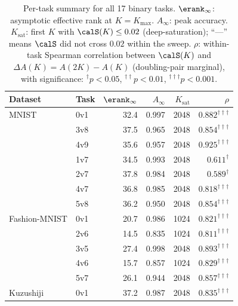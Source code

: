 \begin{table}[t]
  \centering
  \caption{Per-task summary for all 17 binary tasks.
    $\erank_\infty$: asymptotic effective rank at $K = K_{\max}$.
    $A_\infty$: peak accuracy.
    $K_{\mathrm{sat}}$: first $K$ with $\calS(K) \leq 0.02$ (deep-saturation);
    ``---'' means $\calS$ did not cross $0.02$ within the sweep.
    $\rho$: within-task Spearman correlation between $\calS(K)$ and
    $\Delta A(K) = A(2K) - A(K)$ (doubling-pair marginal), with
    significance: ${}^\dagger\!p < 0.05$,
    ${}^{\dagger\dagger}\!p < 0.01$,
    ${}^{\dagger\dagger\dagger}\!p < 0.001$.}
  \label{tab:pertask}
  \small
  \setlength{\tabcolsep}{4pt}
  \begin{tabular}{llrrrr}
    \toprule
    Dataset & Task & $\erank_\infty$ & $A_\infty$ & $K_{\mathrm{sat}}$ & $\rho$ \\
    \midrule
    MNIST        & 0v1            & 32.4 & 0.997 &  2048 & $0.882^{{\dagger\dagger\dagger}}$ \\
                 & 3v8            & 37.5 & 0.965 &  2048 & $0.854^{{\dagger\dagger\dagger}}$ \\
                 & 4v9            & 35.6 & 0.957 &  2048 & $0.925^{{\dagger\dagger\dagger}}$ \\
                 & 1v7            & 34.5 & 0.993 &  2048 & $0.611^{{\dagger}}$ \\
                 & 2v7            & 37.8 & 0.984 &  2048 & $0.589^{{\dagger}}$ \\
                 & 4v7            & 36.8 & 0.985 &  2048 & $0.818^{{\dagger\dagger\dagger}}$ \\
                 & 5v8            & 36.2 & 0.950 &  2048 & $0.854^{{\dagger\dagger\dagger}}$ \\
    \midrule
    Fashion-MNIST & 0v1            & 20.7 & 0.986 &  1024 & $0.821^{{\dagger\dagger\dagger}}$ \\
                 & 2v6            & 14.5 & 0.835 &  1024 & $0.811^{{\dagger\dagger\dagger}}$ \\
                 & 3v5            & 27.4 & 0.998 &  2048 & $0.893^{{\dagger\dagger\dagger}}$ \\
                 & 4v6            & 15.7 & 0.857 &  1024 & $0.829^{{\dagger\dagger\dagger}}$ \\
                 & 5v7            & 26.1 & 0.944 &  2048 & $0.857^{{\dagger\dagger\dagger}}$ \\
    \midrule
    Kuzushiji    & 0v1            & 37.2 & 0.987 &  2048 & $0.835^{{\dagger\dagger\dagger}}$ \\

\end{tabular}
\end{table}
